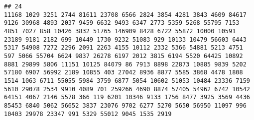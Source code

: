 \documentclass{article}\usepackage[]{graphicx}\usepackage[]{color}
\makeatletter
\newenvironment{kframe}{%
 \def\at@end@of@kframe{}%
 \ifinner\ifhmode%
  \def\at@end@of@kframe{\end{minipage}}%
  \begin{minipage}{\columnwidth}%
 \fi\fi%
 \def\FrameCommand##1{\hskip\@totalleftmargin \hskip-\fboxsep
 \colorbox{shadecolor}{##1}\hskip-\fboxsep
     \hskip-\linewidth \hskip-\@totalleftmargin \hskip\columnwidth}%
 \MakeFramed {\advance\hsize-\width
   \@totalleftmargin\z@ \linewidth\hsize
   \@setminipage}}%
 {\par\unskip\endMakeFramed%
 \at@end@of@kframe}
\newenvironment{knitrout}{}{} %
\makeatother
\begin{document}
\begin{knitrout}
\begin{kframe}
\begin{verbatim}
## 24                                                                                                                                                                                                                                                                                                                                                                                                                                                                                                                                                       11168 1029 3251 2744 81611 23708 6566 2824 3854 4281 3843 4609 84617 9126 30968 4893 2037 9459 6632 9493 6347 2773 5359 5268 55795 7153 4851 7027 858 10426 3832 51765 146909 8428 6722 55872 10000 10591 23189 9181 2182 699 10449 1730 9232 51083 929 10133 10479 56603 6443 5317 54908 7272 2296 2091 2263 4155 10112 2332 5366 54881 5213 4751 597 5066 55704 6624 9837 26278 6197 2012 3815 6194 5520 64425 10892 8881 29899 5806 11151 10125 84079 86 7913 8898 22873 10885 9839 5202 57180 6907 56992 2189 10855 403 27042 8936 8877 5585 3868 4478 1808 1514 1063 6711 55055 5984 3759 6877 5054 10602 51053 10484 23336 7159 5610 29078 2534 9910 4089 701 259266 4690 8874 57405 54962 6742 10542 64151 4067 2146 5578 366 119 6201 10346 9133 1756 8477 3925 3569 4436 85453 6840 5062 56652 3837 23076 9702 6277 5270 5650 56950 11097 996 10403 29978 23347 991 5329 55012 9045 1535 2919
\end{verbatim}
\end{kframe}
\end{knitrout}
\end{document}
